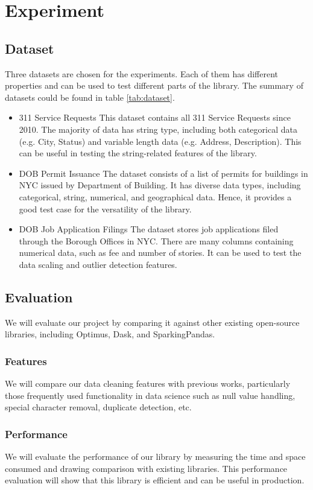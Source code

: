 \documentclass[sigconf]{acmart}
\begin{document}
\section{Experiment}
\subsection{Dataset}
Three datasets are chosen for the experiments. Each of them has different properties and can be used to test different parts of the library. The summary of datasets could be found in table \ref{tab:dataset}.
\begin{itemize}
	\item{311 Service Requests}\cite{nycopendata1} This dataset contains all 311 Service Requests since 2010. The majority of data has string type, including both categorical  data (e.g. City, Status) and variable length data (e.g. Address, Description). This can be useful in testing the string-related features of the library.
	\item{DOB Permit Issuance}\cite{nycopendata2} The dataset consists of a list of permits for buildings in NYC issued by Department of Building. It has diverse data types, including categorical, string, numerical, and geographical data. Hence, it provides a good test case for the versatility of the library. 
	\item{DOB Job Application Filings}\cite{nycopendata3} The dataset stores job applications filed through the Borough Offices in NYC. There are many columns containing numerical data, such as fee and number of stories. It can be used to test the data scaling and outlier detection features. 
\end{itemize}

\subsection{Evaluation}
We will evaluate our project by comparing it against other existing open-source libraries, including Optimus\cite{optimus}, Dask\cite{dask}, and SparkingPandas\cite{sparklingpandas}. 
\subsubsection{Features}
We will compare our data cleaning features with previous works, particularly those frequently used functionality in data science such as null value handling, special character removal, duplicate detection, etc. 
\subsubsection{Performance}
We will evaluate the performance of our library by measuring the time and space consumed and drawing comparison with existing libraries. This performance evaluation will show that this library is efficient and can be useful in production. 
\end{document}
